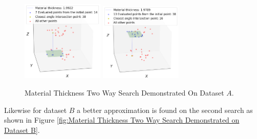 \documentclass[%
]{USN-MSc}
\begin{document}
\begin{figure}[H]
  \centering
  \includegraphics[width=0.35\textwidth]{fig/SVD Material Thickness Search 1.png}
  \hspace{0.5cm}
  \includegraphics[width=0.35\textwidth]{fig/SVD Material Thickness Search 2.png}
  \caption{Material Thickness Two Way Search Demonstrated On Dataset \(A\).}
  \label{fig:Material Thickness Two Way Search Demonstrated on Dataset A}
\end{figure}

Likewise for dataset \(B\) a better approximation is found on the second search as shown in Figure \ref{fig:Material Thickness Two Way Search Demonstrated on Dataset B}.
\end{document}
